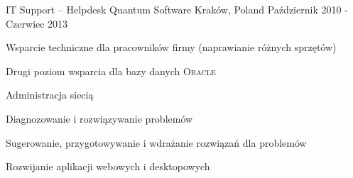 \begin{cventries}
  \cventry
    {IT Support -- Helpdesk}
    {Quantum Software} 
    {Kraków, Poland} 
    {Październik 2010 - Czerwiec 2013}
    {\begin{cvitems} 
        \item {Wsparcie techniczne dla pracowników firmy (naprawianie różnych sprzętów)}
        \item {Drugi poziom wsparcia dla bazy danych \textsc{Oracle}}
        \item {Administracja siecią}
        \item {Diagnozowanie i rozwiązywanie problemów}
        \item {Sugerowanie, przygotowywanie i wdrażanie rozwiązań dla problemów}
        \item {Rozwijanie aplikacji webowych i desktopowych}
	\end{cvitems}}
\end{cventries}
